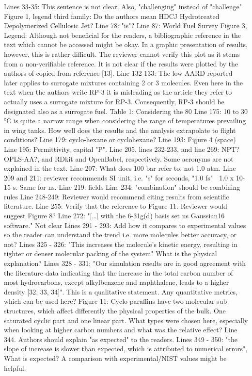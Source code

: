 \documentclass{article}
\begin{document}
Lines 33-35: This sentence is not clear. Also, "challenging" instead of "challenge"
Figure 1, legend third family: Do the authors mean HDCJ Hydrotreated Depolymerized Cellulosic Jet?
Line 78: "is"?
Line 87: World Fuel Survey
Figure 3, Legend: Although not beneficial for the readers, a bibliographic reference in the text which cannot be accessed might be okay. In a graphic presentation of results, however, this is rather difficult. The reviewer cannot verify this plot as it stems from a non-verifiable reference. It is not clear if the results were plotted by the authors of copied from reference [13].
Line 132-133: The low AARD reported later applies to surrogate mixtures containing 2 or 3 molecules. Even here in the text when the authors write RP-3 it is misleading as the article they refer to actually uses a surrogate mixture for RP-3. Consequently, RP-3 should be designated also as a surrogate fuel.
Table 1: Considering the 80%
Line 175: 10 to 30 °C is quite a narrow range when considering the range of temperatures prevailing in wing tanks. How well does the results and the analysis extrapolate to flight conditions?
Line 179: cyclo-hexane or cyclohexane?
Line 193: Figure 4 (space)
Line 195: Permittivity, capital "P".
Line 205, lines 232-233, and line 269: NPT? OPLS-AA?, and RDkit and OpenBabel, respectively. Some acronyms are not explained in the text.
Line 207: What does 100 bar refer to, not 1.0 atm.
Line 209 and 211: reviewer recommends SI unit, i.e. "s" for seconds, "1.0 fs"  1.0 x 10-15 s. Same for ns.
Line 219: fields
Line 234: "combination" should be combining rules
Line 248-249: Reviewer would recommend citing results from scientific literature.
Line 255: Verify that the reference to Figure 11. Reviewer would suggest Figure 8?
Line 272: "[…] with the 6-31g(d) basis set us Gaussian16 software." Not clear
Lines 291 - 293: Add how it compares to experimental values so the reader can understand the trend i.e. more molecules better accuracy, or not?
Lines 325 - 326: "This increases the molecule's kinetic energy, resulting in tighter or denser molecular packing of the system" What is the physical explanation?
Lines 328 - 331: "Our simulation results are in good agreement with the literature data indicating that the increase in the total carbon number of most hydrocarbons, except alkylbenzene and naphthalene, leads to a higher density [32, 33, 34]". This is a qualitative statement. Any quantitative metrics, which can be used here?
Figure 11: Cyclo-paraffins have two molecular sub-structures, which affect differently the physical properties of the bulk. One saturated cyclic part and one linear part. What types were chosen here, especially when looking at higher carbon numbers and what was the relative effect?
Line 344. Authors should explain "as expected" to the readers.
Lines 349 - 350: "the slope of increase is slower than expected, which is attributed to numerical errors", What is expected? A comparison with experimental/NIST values might be helpful.
\end{document}
